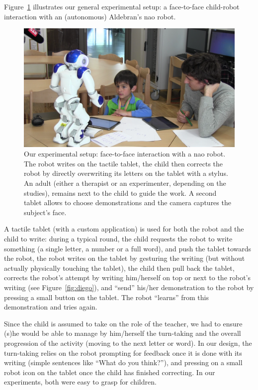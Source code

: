 \documentclass{sig-alternate}
\begin{document}
Figure~\ref{realSetup} illustrates our general experimental setup: a
face-to-face child-robot interaction with an (autonomous) Aldebran's {\sc nao}
robot.

\begin{figure}[h!]
    \centering
    \includegraphics[width=1\columnwidth]{realSetup}
    \caption{\small Our experimental setup: face-to-face interaction with a {\sc
            nao} robot.  The robot writes on the tactile tablet, the child then
            corrects the robot by directly overwriting its letters on the tablet
            with a stylus. An adult (either a therapist or an experimenter,
            depending on the studies), remains next to the child to guide the work. 
            A second tablet allows to choose demonstrations and the camera captures the subject's face.}
    \label{realSetup}
\end{figure}

A tactile tablet (with a custom application) is used for both the robot and the child to write: during a typical round, the child requests the robot to write something (a single letter, a number or a full word), and push the tablet towards the robot, the robot writes on the tablet by gesturing the writing (but without actually physically touching the tablet), the child then pull back the
tablet, corrects the robot's attempt by writing him/herself on top or next to the robot's writing (see Figure~\ref{fig:diego}), and ``send'' his/her demonstration to the robot by pressing a small button on the tablet. The robot ``learns'' from this demonstration and tries again.

Since the child is assumed to take on the role of the teacher, we had to ensure (s)he would be able to manage by him/herself the turn-taking and the overall progression of the activity (moving to the next letter or word). In our design, the turn-taking relies on the robot prompting for feedback once it is done with its writing (simple sentences like ``What do you think?''), and pressing on a
small robot icon on the tablet once the child has finished correcting. In our experiments, both were easy to grasp for children.
\end{document}
